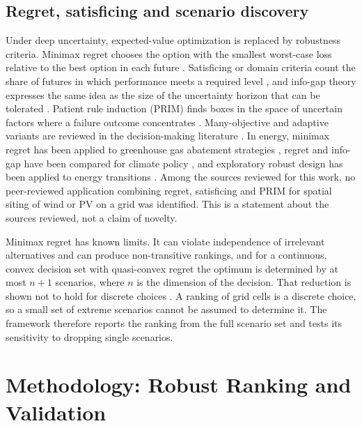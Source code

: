 \subsection{Regret, satisficing and scenario discovery}
Under deep uncertainty, expected-value optimization is replaced by robustness criteria. Minimax regret chooses the option with the smallest worst-case loss relative to the best option in each future \citep{savage1951,lempert2006}. Satisficing or domain criteria count the share of futures in which performance meets a required level \citep{herman2015,mcphail2018}, and info-gap theory expresses the same idea as the size of the uncertainty horizon that can be tolerated \citep{benhaim2006}. Patient rule induction (PRIM) finds boxes in the space of uncertain factors where a failure outcome concentrates \citep{friedman1999,bryant2010}. Many-objective and adaptive variants are reviewed in the decision-making literature \citep{kasprzyk2013,hamarat2013,marchau2019}. In energy, minimax regret has been applied to greenhouse gas abatement strategies \citep{loulou1999}, regret and info-gap have been compared for climate policy \citep{hall2012}, and exploratory robust design has been applied to energy transitions \citep{hamarat2013}. Among the sources reviewed for this work, no peer-reviewed application combining regret, satisficing and PRIM for spatial siting of wind or PV on a grid was identified. This is a statement about the sources reviewed, not a claim of novelty.

Minimax regret has known limits. It can violate independence of irrelevant alternatives and can produce non-transitive rankings, and for a continuous, convex decision set with quasi-convex regret the optimum is determined by at most $n+1$ scenarios, where $n$ is the dimension of the decision. That reduction is shown not to hold for discrete choices \citep{andersonzachary}. %
A ranking of grid cells is a discrete choice, so a small set of extreme scenarios cannot be assumed to determine it. The framework therefore reports the ranking from the full scenario set and tests its sensitivity to dropping single scenarios.

\section{Methodology: Robust Ranking and Validation}
\label{sec:g7-method}

